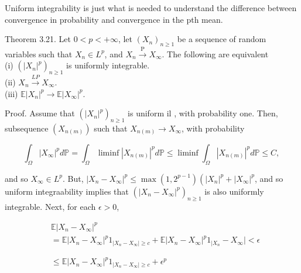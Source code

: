 \documentclass{amsbook}
\theoremstyle{plain}%
\theoremstyle{definition}
\theoremstyle{remark}
\begin{document}
Uniform integrability is just what is needed to understand the difference between convergence in probability and convergence in the pth mean.

Theorem 3.21. Let $0<p<+\infty$, let $\left(X_{n}\right)_{n \geq 1}$ be a sequence of random variables such that $X_{n} \in L^{p}$, and $X_{n} \xrightarrow{\mathrm{P}} X_{\infty}$. The following are equivalent\\
(i) $\left(\left|X_{n}\right|^{p}\right)_{n \geq 1}$ is uniformly integrable.\\
(ii) $X_{n} \xrightarrow{L P} X_{\infty}$.\\
(iii) $\mathbb{E}\left|X_{n}\right|^{p} \rightarrow \mathbb{E}\left|X_{\infty}\right|^{p}$.

Proof. Assume that $\left(\left|X_{n}\right|^{p}\right)_{n \geq 1}$ is uniform il , with probability one. Then,\\
subsequence $\left(X_{n(m)}\right)$ such that $X_{n(m)} \rightarrow X_{\infty}$, with probability

$$
\int_{\Omega}\left|X_{\infty}\right|^{p} d \mathbb{P}=\int_{\Omega} \liminf \left|X_{n(m)}\right|^{p} d \mathbb{P} \leq \liminf \int_{\Omega}\left|X_{n(m)}\right|^{p} d \mathbb{P} \leq C \text {, }
$$

and so $X_{\infty} \in L^{p}$. But, $\left|X_{n}-X_{\infty}\right|^{p} \leq \max \left(1,2^{p-1}\right)\left(\left|X_{n}\right|^{p}+\left|X_{\infty}\right|^{p}\right.$, and so uniform integraability implies that $\left(\left|X_{n}-X_{\infty}\right|^{p}\right)_{n \geq 1}$ is also uniformly integrable. Next, for each $\epsilon>0$,

  $$
  \begin{aligned}
    & \mathbb{E}\left|X_{n}-X_{\infty}\right|^{p}                                                                                                                               \\
    & =\mathbb{E}\left|X_{n}-X_{\infty}\right|^{p} 1_{\left|X_{n}-X_{\infty}\right| \geq c}+\mathbb{E}\left|X_{n}-X_{\infty}\right|^{p} 1_{\mid X_{n}}-X_{\infty} \mid<\epsilon \\
    &                                                                                                                                                                           \\
    &                                                                                                                                                                           \\
    & \leq \mathbb{E}\left|X_{n}-X_{\infty}\right|^{p} 1_{\left|X_{n}-X_{\infty}\right| \geq c}+\epsilon^{p}
  \end{aligned}
  $$
\end{document}
